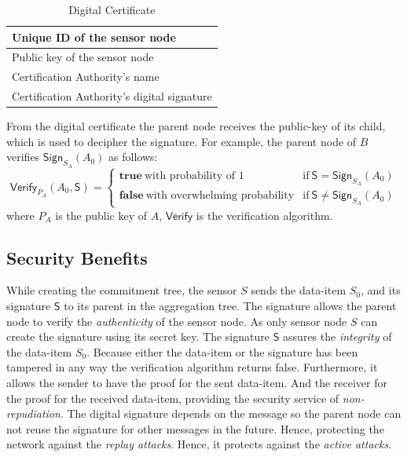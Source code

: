 		\begin{table}[!htb]	
	  		\caption{Digital Certificate}
			  \label{table:digital-certificate}
				\centering
				\begin{tabular}{ |l| }
			    \hline
			    Unique ID of the sensor node \\
			    \hline
			    Public key of the sensor node \\	
			    \hline
			    Certification Authority's name \\
			    \hline
			    Certification Authority's digital signature \\
			    \hline
				\end{tabular}
	  \end{table}
	  From the digital certificate the parent node receives the public-key of its child, which is used to decipher the signature.
	  For example, the parent node of $B$ verifies $\textsf{Sign}_{S_{A}}(A_{0})$ as follows:
	  \begin{equation}
			\textsf{Verify}_{P_{A}}(A_{0},\textsf{S}) = 
			\begin{cases}
			 \textbf{true}\ \mbox{with probability of 1} & \mbox{if}\ \textsf{S} = \textsf{Sign}_{S_{A}}(A_{0})\\
			 \textbf{false}\ \mbox{with overwhelming probability} & \mbox{if}\ \textsf{S} \neq \textsf{Sign}_{S_{A}}(A_{0})
			\end{cases}
			\label{eq:verification}
		\end{equation}
	  where $P_{A}$ is the public key of $A$, $\textsf{Verify}$ is the verification algorithm.
	
	\subsection{Security Benefits}
		\label{subsec:security benefits of signing the data-item}
		While creating the commitment tree, the sensor $S$ sends the data-item $S_{0}$, and its signature $\textsf{S}$ to its parent in the aggregation tree.
		The signature allows the parent node to verify the \textit{authenticity} of the sensor node.
		As only sensor node $S$ can create the signature using its secret key. 
		The signature $\textsf{S}$ assures the \textit{integrity} of the data-item $S_{0}$.
		Because either the data-item or the signature has been tampered in any way the verification algorithm returns false.
		Furthermore, it allows the sender to have the proof for the sent data-item.
		And the receiver for the proof for the received data-item, providing the security service of \textit{non-repudiation}.
		The digital signature depends on the message so the parent node can not reuse the signature for other messages in the future.
		Hence, protecting the network against the \textit{replay attacks}.
		Hence, it protects against the \textit{active attacks}.

